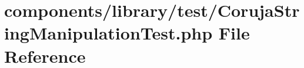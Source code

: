 \hypertarget{_coruja_string_manipulation_test_8php}{
\section{components/library/test/CorujaStringManipulationTest.php File Reference}
\label{_coruja_string_manipulation_test_8php}
}
